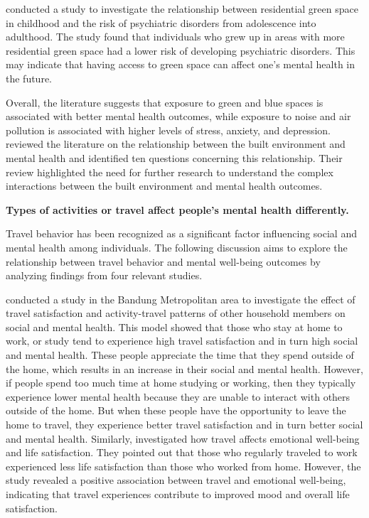 \documentclass[
  letterpaper,
  authoryear]{elsarticle}
\begin{document}
\citet{engemann2019} conducted a study to investigate the relationship
between residential green space in childhood and the risk of psychiatric
disorders from adolescence into adulthood. The study found that
individuals who grew up in areas with more residential green space had a
lower risk of developing psychiatric disorders. This may indicate that
having access to green space can affect one's mental health in the
future.

Overall, the literature suggests that exposure to green and blue spaces
is associated with better mental health outcomes, while exposure to
noise and air pollution is associated with higher levels of stress,
anxiety, and depression. \citet{hoisingtonTenQuestionsConcerning2019}
reviewed the literature on the relationship between the built
environment and mental health and identified ten questions concerning
this relationship. Their review highlighted the need for further
research to understand the complex interactions between the built
environment and mental health outcomes.

\textbf{Types of activities or travel affect people's mental health
differently.}

Travel behavior has been recognized as a significant factor influencing
social and mental health among individuals. The following discussion
aims to explore the relationship between travel behavior and mental
well-being outcomes by analyzing findings from four relevant studies.

\citet{syahputriEffectTravelSatisfaction2022} conducted a study in the
Bandung Metropolitan area to investigate the effect of travel
satisfaction and activity-travel patterns of other household members on
social and mental health. This model showed that those who stay at home
to work, or study tend to experience high travel satisfaction and in
turn high social and mental health. These people appreciate the time
that they spend outside of the home, which results in an increase in
their social and mental health. However, if people spend too much time
at home studying or working, then they typically experience lower mental
health because they are unable to interact with others outside of the
home. But when these people have the opportunity to leave the home to
travel, they experience better travel satisfaction and in turn better
social and mental health. Similarly, \citet{frimanHowDoesTravel2017}
investigated how travel affects emotional well-being and life
satisfaction. They pointed out that those who regularly traveled to work
experienced less life satisfaction than those who worked from home.
However, the study revealed a positive association between travel and
emotional well-being, indicating that travel experiences contribute to
improved mood and overall life satisfaction.
\end{document}
